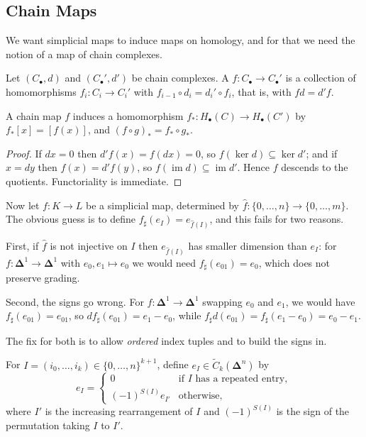 \documentclass[a4paper]{scrartcl}
\newcommand{\bDelta}{\boldsymbol{\Delta}}
\begin{document}
\subsection{Chain Maps}

We want simplicial maps to induce maps on homology, and for that we need the notion of a
map of chain complexes.

\begin{definition}
	Let $(C_\bullet,d)$ and $(C_\bullet',d')$ be chain complexes. A  $f: C_\bullet \to C_\bullet'$ is a collection of homomorphisms $f_i: C_i \to C_i'$ with $f_{i-1}\circ d_i = d_i'\circ f_i$, that is, with $fd = d'f$.
\end{definition}

\begin{proposition} \label{prop:chain-map-induces}
	A chain map $f$ induces a homomorphism $f_*: H_\bullet(C) \to H_\bullet(C')$ by $f_*[x] = [f(x)]$, and $(f\circ g)_* = f_*\circ g_*$.
\end{proposition}
\begin{proof}
	If $dx = 0$ then $d'f(x) = f(dx) = 0$, so $f(\ker d)\subseteq \ker d'$; and if $x = dy$ then $f(x) = d'f(y)$, so $f(\operatorname{im}d)\subseteq\operatorname{im}d'$. Hence $f$ descends to the quotients. Functoriality is immediate.
\end{proof}

Now let $f: K \to L$ be a simplicial map, determined by
$\hat f: \{0,\dots,n\}\to\{0,\dots,m\}$. The obvious guess is to define
$f_\sharp(e_I) = e_{\hat f(I)}$, and this fails for two reasons.

First, if $\hat f$ is not injective on $I$ then $e_{\hat f(I)}$ has smaller dimension than
$e_I$: for $f: \bDelta^1 \to \bDelta^1$ with $e_0, e_1 \mapsto e_0$ we would need
$f_\sharp(e_{01}) = e_0$, which does not preserve grading.

Second, the signs go wrong. For $f: \bDelta^1\to\bDelta^1$ swapping $e_0$ and $e_1$, we
would have $f_\sharp(e_{01}) = e_{01}$, so $d f_\sharp(e_{01}) = e_1-e_0$, while
$f_\sharp d(e_{01}) = f_\sharp(e_1 - e_0) = e_0 - e_1$.

The fix for both is to allow \emph{ordered} index tuples and to build the signs in.

\begin{definition}
	For $I = (i_0,\dots,i_k) \in \{0,\dots,n\}^{k+1}$, define $e_I \in \widetilde C_k(\bDelta^n)$ by
	$$
	e_I = \begin{cases}0 & \text{if $I$ has a repeated entry},\\ (-1)^{S(I)}e_{I'} & \text{otherwise},\end{cases}
	$$
	where $I'$ is the increasing rearrangement of $I$ and $(-1)^{S(I)}$ is the sign of the permutation taking $I$ to $I'$.
\end{definition}
\end{document}

